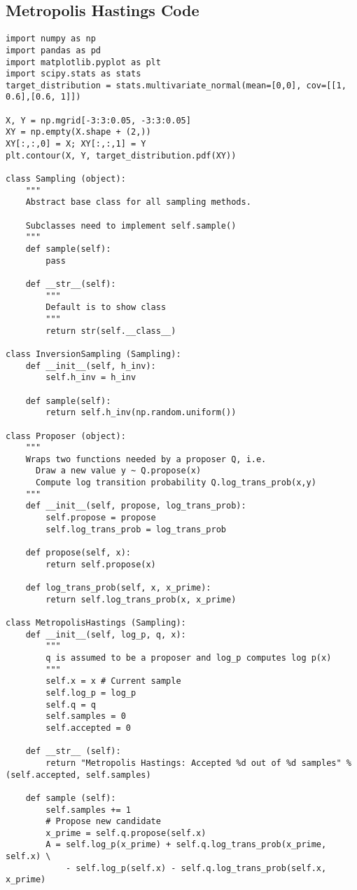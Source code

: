\begin{appendices}
\section{Metropolis Hastings Code}\label{app:MH_code}
\begin{lstlisting}
import numpy as np
import pandas as pd
import matplotlib.pyplot as plt
import scipy.stats as stats
target_distribution = stats.multivariate_normal(mean=[0,0], cov=[[1, 0.6],[0.6, 1]])

X, Y = np.mgrid[-3:3:0.05, -3:3:0.05]
XY = np.empty(X.shape + (2,))
XY[:,:,0] = X; XY[:,:,1] = Y
plt.contour(X, Y, target_distribution.pdf(XY))

class Sampling (object):
    """
    Abstract base class for all sampling methods.
    
    Subclasses need to implement self.sample()
    """
    def sample(self):
        pass
    
    def __str__(self):
        """
        Default is to show class
        """
        return str(self.__class__)
    
class InversionSampling (Sampling):
    def __init__(self, h_inv):
        self.h_inv = h_inv
        
    def sample(self):
        return self.h_inv(np.random.uniform())
    
class Proposer (object):
    """
    Wraps two functions needed by a proposer Q, i.e.
      Draw a new value y ~ Q.propose(x)
      Compute log transition probability Q.log_trans_prob(x,y) 
    """
    def __init__(self, propose, log_trans_prob):
        self.propose = propose
        self.log_trans_prob = log_trans_prob
    
    def propose(self, x):
        return self.propose(x)
    
    def log_trans_prob(self, x, x_prime):
        return self.log_trans_prob(x, x_prime)

class MetropolisHastings (Sampling):
    def __init__(self, log_p, q, x):
        """
        q is assumed to be a proposer and log_p computes log p(x)
        """
        self.x = x # Current sample
        self.log_p = log_p
        self.q = q
        self.samples = 0
        self.accepted = 0
        
    def __str__ (self):
        return "Metropolis Hastings: Accepted %d out of %d samples" % (self.accepted, self.samples)
        
    def sample (self):
        self.samples += 1
        # Propose new candidate
        x_prime = self.q.propose(self.x)
        A = self.log_p(x_prime) + self.q.log_trans_prob(x_prime, self.x) \
            - self.log_p(self.x) - self.q.log_trans_prob(self.x, x_prime)


\end{lstlisting}
\end{appendices}
